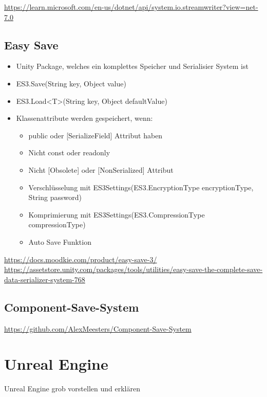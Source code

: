 \url{https://learn.microsoft.com/en-us/dotnet/api/system.io.streamwriter?view=net-7.0}

\subsection{Easy Save}

\begin{itemize}
    \item Unity Package, welches ein komplettes Speicher und Serialisier System ist
    \item ES3.Save(String key, Object value)
    \item ES3.Load<T>(String key, Object defaultValue)
    \item Klassenattribute werden gespeichert, wenn:
    \begin{itemize}
        \item public oder [SerializeField] Attribut haben
        \item Nicht const oder readonly
        \item Nicht [Obsolete] oder [NonSerialized] Attribut
        \item Verschlüsselung mit ES3Settings(ES3.EncryptionType encryptionType, String password)
        \item Komprimierung mit ES3Settings(ES3.CompressionType compressionType)
        \item Auto Save Funktion
    \end{itemize}
\end{itemize}
\url{https://docs.moodkie.com/product/easy-save-3/}\\
\url{https://assetstore.unity.com/packages/tools/utilities/easy-save-the-complete-save-data-serializer-system-768}

\subsection{Component-Save-System}

\url{https://github.com/AlexMeesters/Component-Save-System}


\section{Unreal Engine}
Unreal Engine grob vorstellen und erklären

